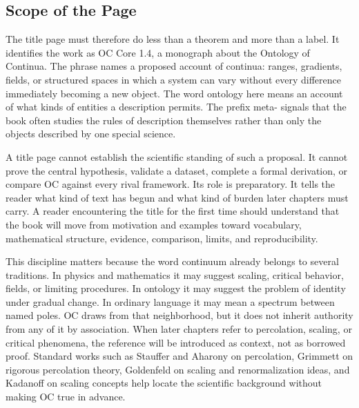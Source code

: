 \documentclass[11pt,a4paper,openany]{book}
\begin{document}
\subsection{Scope of the Page}
The title page must therefore do less than a theorem and more than a label. It identifies the work as OC Core 1.4, a monograph about the Ontology of Continua. The phrase names a proposed account of continua: ranges, gradients, fields, or structured spaces in which a system can vary without every difference immediately becoming a new object. The word ontology here means an account of what kinds of entities a description permits. The prefix meta- signals that the book often studies the rules of description themselves rather than only the objects described by one special science. \cite{stauffer_percolation,grimmett_percolation}\par
A title page cannot establish the scientific standing of such a proposal. It cannot prove the central hypothesis, validate a dataset, complete a formal derivation, or compare OC against every rival framework. Its role is preparatory. It tells the reader what kind of text has begun and what kind of burden later chapters must carry. A reader encountering the title for the first time should understand that the book will move from motivation and examples toward vocabulary, mathematical structure, evidence, comparison, limits, and reproducibility.\par
This discipline matters because the word continuum already belongs to several traditions. In physics and mathematics it may suggest scaling, critical behavior, fields, or limiting procedures. In ontology it may suggest the problem of identity under gradual change. In ordinary language it may mean a spectrum between named poles. OC draws from that neighborhood, but it does not inherit authority from any of it by association. When later chapters refer to percolation, scaling, or critical phenomena, the reference will be introduced as context, not as borrowed proof. Standard works such as Stauffer and Aharony on percolation, Grimmett on rigorous percolation theory, Goldenfeld on scaling and renormalization ideas, and Kadanoff on scaling concepts help locate the scientific background without making OC true in advance.\par
\end{document}
